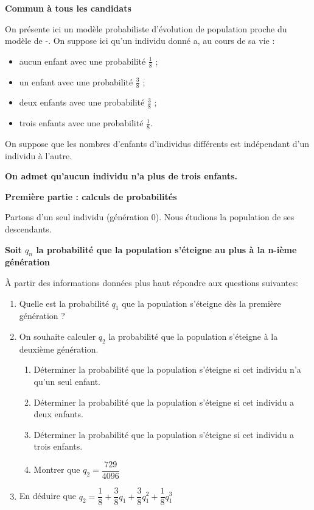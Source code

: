 \documentclass[12pt,a4paper,french]{article}
\newcommand{\brm}[1]{\marginpar{\addpoints*{#1}}}%
\begin{document}
\vspace{4cm}
\begin{question}
\vspace{-5.8mm}
\begin{center}\textbf{Commun à tous les candidats}\end{center}

On présente ici un modèle probabiliste d'évolution de population proche du
modèle de -. On suppose ici qu'un individu donné a,
au cours de sa vie :
\begin{itemize}
\item aucun enfant avec une probabilité $\frac18$ ;
\item un enfant avec une probabilité $\frac38$ ;
\item deux enfants avec une probabilité $\frac38$ ;
\item trois enfants avec une probabilité $\frac18$.
\end{itemize}
On suppose que les nombres d'enfants d'individus différents est indépendant d'un individu à l'autre.

{\bfseries On admet qu'aucun individu n'a plus de trois enfants.}


\textbf{Première partie : calculs de probabilités}

Partons d'un seul individu (génération 0). Nous étudions la population de ses
descendants.

{\bfseries Soit $q_{n}$ la probabilité que la population s'éteigne au plus à la n-ième génération}


\`A partir des informations données plus haut répondre aux questions suivantes:
\begin{enumerate}[itemsep=5pt]
\item Quelle est la probabilité $q_{1}$ que la population s'éteigne dès la première
génération ?%
\brm{0.25}

\item On souhaite calculer $q_{2}$ la probabilité que la population s'éteigne à la deuxième génération.
    \begin{enumerate}[itemsep=5pt]
      \item Déterminer la probabilité que la population s'éteigne si cet individu n'a qu'un seul enfant. \brm{0.25}
      \item Déterminer la probabilité que la population s'éteigne si cet individu a deux enfants. \brm{0.25}
      \item Déterminer la probabilité que la population s'éteigne si cet individu a trois enfants. \brm{0.25}
      \item Montrer que $q_{2}= \dfrac{729}{4096}$ \brm{0.5}
    \end{enumerate}
  \item En déduire que $q_{2}= \dfrac{1}{8}+\dfrac{3}{8}q_{1}+\dfrac{3}{8}q_{1}^{2}+\dfrac{1}{8} q_{1}^{3}$ \brm{0.5}
  

\end{enumerate}
\end{question}
\end{document}
